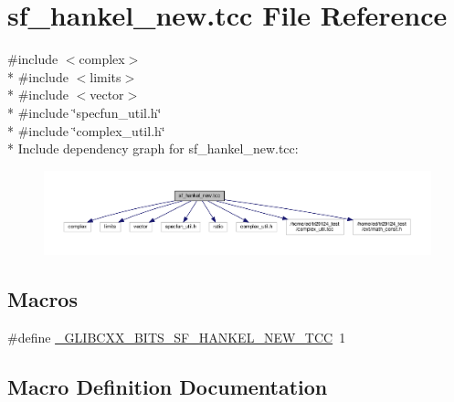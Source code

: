 \hypertarget{sf__hankel__new_8tcc}{}\section{sf\+\_\+hankel\+\_\+new.\+tcc File Reference}
\label{sf__hankel__new_8tcc}
{\ttfamily \#include $<$complex$>$}\\*
{\ttfamily \#include $<$limits$>$}\\*
{\ttfamily \#include $<$vector$>$}\\*
{\ttfamily \#include \char`\"{}specfun\+\_\+util.\+h\char`\"{}}\\*
{\ttfamily \#include \char`\"{}complex\+\_\+util.\+h\char`\"{}}\\*
Include dependency graph for sf\+\_\+hankel\+\_\+new.\+tcc\+:\nopagebreak
\begin{figure}[H]
\begin{center}
\leavevmode
\includegraphics[width=350pt]{sf__hankel__new_8tcc__incl}
\end{center}
\end{figure}
\subsection*{Macros}
\begin{DoxyCompactItemize}
\item 
\#define \hyperlink{sf__hankel__new_8tcc_a3f0d94d8fb94ad2e003fd0b54ce51a6d}{\+\_\+\+G\+L\+I\+B\+C\+X\+X\+\_\+\+B\+I\+T\+S\+\_\+\+S\+F\+\_\+\+H\+A\+N\+K\+E\+L\+\_\+\+N\+E\+W\+\_\+\+T\+C\+C}~1
\end{DoxyCompactItemize}


\subsection{Macro Definition Documentation}
\hypertarget{sf__hankel__new_8tcc_a3f0d94d8fb94ad2e003fd0b54ce51a6d}{}
